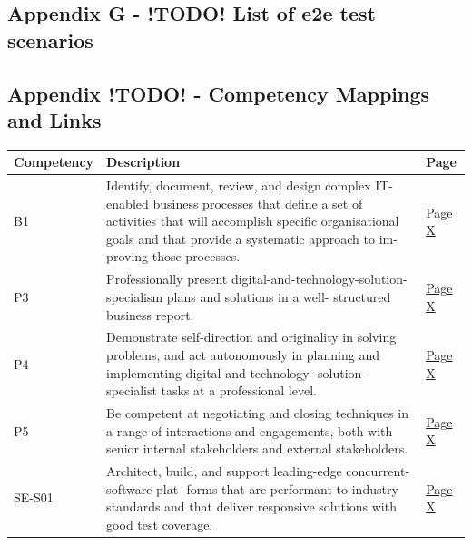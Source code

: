   \newpage
  \subsection{Appendix G - !TODO! List of e2e test scenarios}
    \label{sec:AppendixG}
    
  
  \newpage
  \subsection{Appendix !TODO! - Competency Mappings and Links}
    \begin{longtable}{|p{2.5cm}|p{10cm}|p{1.5cm}|}
      \hline
      \textbf{Competency} & \textbf{Description} & \textbf{Page} \\ \hline
      B1                  & Identify, document, review, and design complex IT-enabled business
                            processes that define a set of activities that will accomplish specific
                            organisational goals and that provide a systematic approach to im-
                            proving those processes. & \hyperref[sec:cicd]{Page X} \\ \hline

      P3                  & Professionally present digital-and-technology-solution-specialism plans
                            and solutions in a well- structured business report. & \hyperref[sec:cicd]{Page X} \\ \hline

      P4                  & Demonstrate self-direction and originality in solving problems, and
                            act autonomously in planning and implementing digital-and-technology-
                            solution-specialist tasks at a professional level. & \hyperref[sec:cicd]{Page X} \\ \hline

      P5                  & Be competent at negotiating and closing techniques in a range of
                            interactions and engagements, both with senior internal stakeholders
                            and external stakeholders. & \hyperref[sec:cicd]{Page X} \\ \hline

      SE-S01              & Architect, build, and support leading-edge concurrent-software plat-
                            forms that are performant to industry standards and that deliver
                            responsive solutions with good test coverage. & \hyperref[sec:cicd]{Page X} \\ \hline


\end{longtable}
